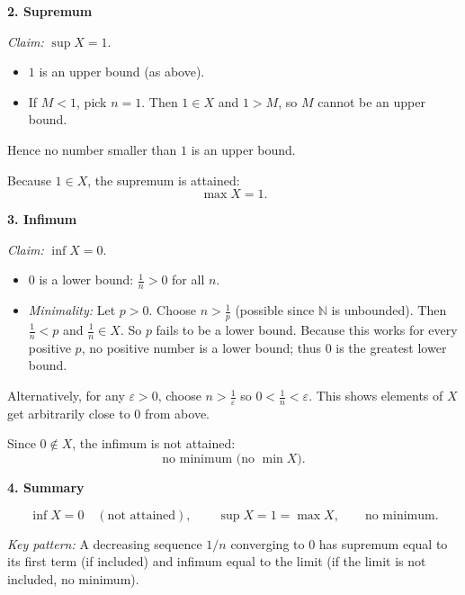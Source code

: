 \documentclass[12pt,a4paper]{article}
\theoremstyle{definition}
\theoremstyle{remark}
\begin{document}
\textbf{2. Supremum}

\emph{Claim:} $\sup X = 1$.

\begin{itemize}
    \item $1$ is an upper bound (as above).
    \item If $M < 1$, pick $n = 1$. Then $1 \in X$ and $1 > M$, so $M$ cannot be an upper bound.
\end{itemize}
Hence no number smaller than $1$ is an upper bound.

Because $1 \in X$, the supremum is attained:
\[
\max X = 1.
\]

\textbf{3. Infimum}

\emph{Claim:} $\inf X = 0$.

\begin{itemize}
    \item $0$ is a lower bound: $\frac{1}{n} > 0$ for all $n$.
    \item \emph{Minimality:} Let $p > 0$. Choose $n > \frac{1}{p}$ (possible since $\mathbb{N}$ is unbounded). Then $\frac{1}{n} < p$ and $\frac{1}{n} \in X$. So $p$ fails to be a lower bound. Because this works for every positive $p$, no positive number is a lower bound; thus $0$ is the greatest lower bound.
\end{itemize}

Alternatively, for any $\varepsilon > 0$, choose $n > \frac{1}{\varepsilon}$ so $0 < \frac{1}{n} < \varepsilon$. This shows elements of $X$ get arbitrarily close to $0$ from above.

Since $0 \notin X$, the infimum is not attained:
\[
\text{no minimum (no } \min X\text{).}
\]

\textbf{4. Summary}

\[
\inf X = 0 \quad (\text{not attained}),\qquad \sup X = 1 = \max X,\qquad \text{no minimum.}
\]

\emph{Key pattern:} A decreasing sequence $1/n$ converging to $0$ has supremum equal to its first term (if included) and infimum equal to the limit (if the limit is not included, no minimum).
\end{document}
